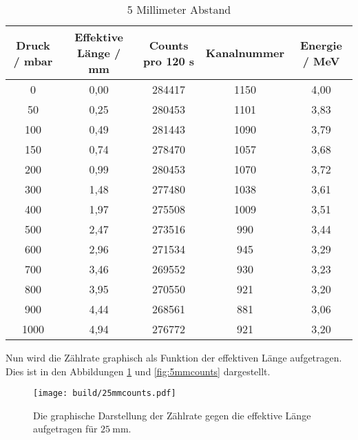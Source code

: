 \begin{table}
  \centering
  \caption{5 Millimeter Abstand}
  \label{tab:5mm}
  \begin{tabular}{c c c c c}
    \toprule
     Druck / \si{\milli\bar} & Effektive Länge / \si{\milli\metre} & Counts pro 120 \si{\second} & Kanalnummer & Energie / \si{\mega\electronvolt}\\
    \midrule
    0   & 0,00 & 284417 & 1150 & 4,00 \\
    50  & 0,25 & 280453 & 1101 & 3,83 \\
    100 & 0,49 & 281443 & 1090 & 3,79 \\
    150 & 0,74 & 278470 & 1057 & 3,68 \\
    200 & 0,99 & 280453 & 1070 & 3,72 \\
    300 & 1,48 & 277480 & 1038 & 3,61 \\
    400 & 1,97 & 275508 & 1009 & 3,51 \\
    500 & 2,47 & 273516 &  990 & 3,44 \\
    600 & 2,96 & 271534 &  945 & 3,29 \\
    700 & 3,46 & 269552 &  930 & 3,23 \\
    800 & 3,95 & 270550 &  921 & 3,20 \\
    900 & 4,44 & 268561 &  881 & 3,06 \\
    1000& 4,94 & 276772 &  921 & 3,20 \\
    \bottomrule
  \end{tabular}
\end{table}
\FloatBarrier
Nun wird die Zählrate graphisch als Funktion der effektiven Länge aufgetragen.
Dies ist in den Abbildungen \ref{fig:25mmcounts} und \ref{fig:5mmcounts} dargestellt.
\FloatBarrier
\begin{figure}
    \centering
    \texttt{[image: build/25mmcounts.pdf]}
    \caption{Die graphische Darstellung der Zählrate gegen die effektive Länge aufgetragen für $\SI{25}{\milli\metre}$.}
    \label{fig:25mmcounts}
\end{figure}

